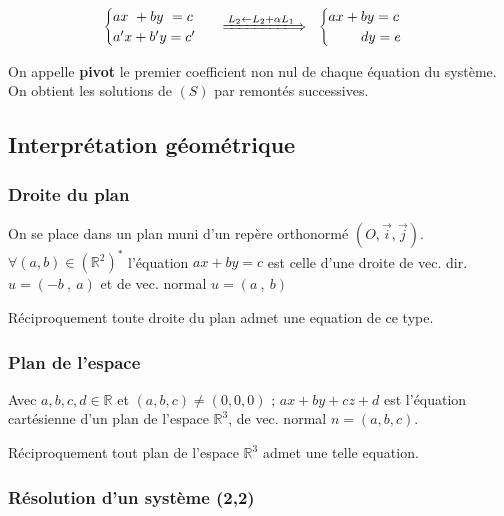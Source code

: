 \documentclass{report}
\newcommand{\R}{\mathbb{R}}
\newcommand{\Sys}{(S)}
\begin{document}
    \[
      \begin{cases}
        ax ~ + by ~= c \\
        a'x + b'y = c'
      \end{cases}
      \;\; \xLongrightarrow{\,L_2 \leftarrow L_2 + \alpha L_1\,} \;\;
      \begin{cases}
        ax + by = c \\
        ~~~~~~~ dy = e
      \end{cases}
    \]\vspace{0.5em}


    On appelle \textbf{pivot} le premier coefficient non nul de chaque équation du système. On obtient les solutions de $\Sys$ par remontés successives.



    \newpage

    
  
  \subsection{Interprétation géométrique}

    \subsubsection{Droite du plan}

      On se place dans un plan muni d'un repère orthonormé $(O,\vec{i},\vec{j})$.\\
      $\forall (a,b)\in(\R^2)^*$ l'équation $\boxed{ax+by=c}$ est celle d'une droite de vec. dir. $\boxed{u=(-b~,~a)}$ et de vec. normal $\boxed{u=(a~,~b)}$
      
      Réciproquement toute droite du plan admet une equation de ce type.

    \subsubsection{Plan de l'espace}

      Avec $a,b,c,d\in\R$ et $(a,b,c)\ne(0,0,0)$ ; $\boxed{ax+by+cz+d}$ est l'équation cartésienne d'un plan de l'espace $\R^3$, de vec. normal $n=(a,b,c)$.
      
      Réciproquement tout plan de l'espace $\R^3$ admet une telle equation.

    \subsubsection{Résolution d'un système (2,2)}
\end{document}

